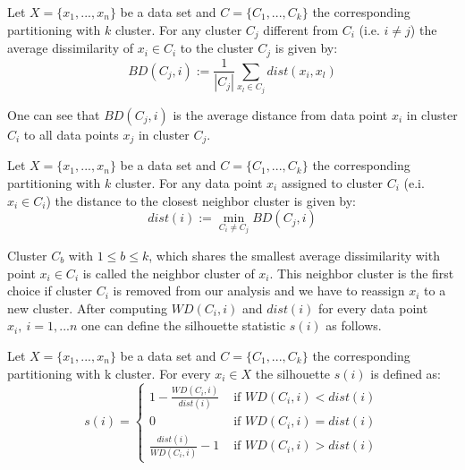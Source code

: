 \begin{definition}
	Let $X=\{x_1, ..., x_n\}$ be a data set and $C=\{C_1, ..., C_k\}$ the corresponding partitioning with $k$ cluster. For any cluster $C_{j}$ different from $C_i$ (i.e. $i \neq j$) the average dissimilarity of  $x_i \in C_{i}$ to the cluster $C_{j}$ is given by: 
	\begin{equation*}\label{equ:dist_C}
		BD(C_j,i) := \frac{1}{|C_j|}\sum_{x_l \in C_j} dist(x_i, x_l) 
	\end{equation*}
\end{definition}

One can see that $BD(C_j,i)$ is the average distance from data point $x_i$ in cluster $C_i$ to all data points $x_j$ in cluster $C_j$. 

\begin{definition}
	Let $X=\{x_1, ..., x_n\}$ be a data set and $C=\{C_1, ..., C_k\}$ the corresponding partitioning with $k$ cluster. For any data point $x_i$ assigned to cluster $C_i$ (e.i. $x_i \in C_i$) the distance to the closest neighbor cluster is given by: 
	\begin{equation*}\label{equ:dist_B}
		dist(i) := \min_{C_i\neq C_j} BD(C_j,i)
	\end{equation*}
\end{definition}

Cluster $C_b$ with $1 \leq b \leq k$, which shares the smallest average dissimilarity with point $x_i \in C_i$ is called the neighbor cluster of $x_i$. This neighbor cluster is the first choice if cluster $C_i$ is removed from our analysis and we have to reassign $x_i$ to a new cluster. After computing $WD(C_i,i)$ and $dist(i)$ for every data point $x_i,~i=1,...n$ one can define the silhouette statistic $s(i)$ as follows.

\begin{definition}
Let $X=\{x_1, ..., x_n\}$ be a data set and $C=\{C_1, ..., C_k\}$ the corresponding partitioning with k cluster. For every $x_i \in X$ the silhouette $s(i)$ is defined as:
	\begin{equation*}\label{equ:silhouette_long}
	s(i) = \begin{cases}
		1-\frac{WD(C_i,i)}{dist(i)} 	& \text{ if } WD(C_i,i) < dist(i)\\
		0 								& \text{ if } WD(C_i,i) = dist(i)\\
		\frac{dist(i)}{WD(C_i,i)}-1 	& \text{ if } WD(C_i,i) > dist(i)
	\end{cases}
	\end{equation*}
\end{definition}

